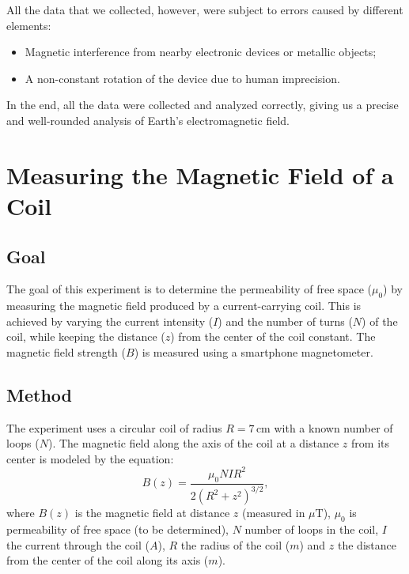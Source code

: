 \documentclass[notitlepage]{report}
\numberwithin{equation}{section}
\theoremstyle{plain}
\theoremstyle{definition}
\theoremstyle{remark}
\begin{document}
All the data that we collected, however, were subject to errors caused by different elements:
\begin{itemize}
    \item Magnetic interference from nearby electronic devices or metallic objects;
    \item A non-constant rotation of the device due to human imprecision.
\end{itemize}

In the end, all the data were collected and analyzed correctly, giving us a precise and well-rounded analysis of Earth’s electromagnetic field.

\chapter{Measuring the Magnetic Field of a Coil}

\section{Goal}
The goal of this experiment is to determine the permeability of free space
(\(\mu_0\)) by measuring the magnetic field produced by a current-carrying coil.
This is achieved by varying the current intensity (\(I\)) and the number of
turns (\(N\)) of the coil, while keeping the distance (\(z\)) from the center of
the coil constant. The magnetic field strength (\(B\)) is measured using a
smartphone magnetometer.

\section{Method}
The experiment uses a circular coil of radius \(R = 7 \, \text{cm}\) with a
known number of loops (\(N\)). The magnetic field along the axis of the coil at
a distance \(z\) from its center is modeled by the equation:
\[
B(z) = \frac{\mu_0 N I R^2}{2 {\left(R^2 + z^2\right)}^{3/2}},
\]
where \(B(z)\) is the magnetic field at distance \(z\) (measured in
\(\mu\text{T}\)), \(\mu_0\) is permeability of free space (to be determined),
\(N\) number of loops in the coil, \(I\) the current through the coil (\(A\)),
\(R\) the radius of the coil  (\(m\)) and \(z\) the distance from the center of
the coil along its axis (\(m\)).
\end{document}
